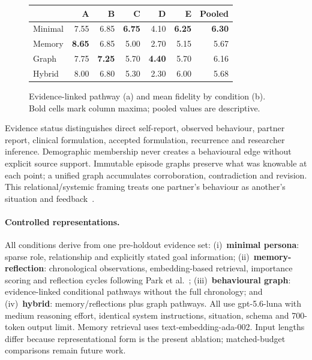 \documentclass{article}
\begin{document}
\begin{figure}[t]
\begin{minipage}[t]{0.50\textwidth}
    \fontsize{7.5}{9}\selectfont
    \begin{tabular}{lrrrrrr}
      \toprule
               & \textbf{A} & \textbf{B} & \textbf{C} & \textbf{D} & \textbf{E} & \textbf{Pooled} \\
      \midrule
      Minimal  & 7.55 & 6.85 & \textbf{6.75} & 4.10 & \textbf{6.25} & \textbf{6.30} \\
      Memory   & \textbf{8.65} & 6.85 & 5.00 & 2.70 & 5.15 & 5.67 \\
      Graph    & 7.75 & \textbf{7.25} & 5.70 & \textbf{4.40} & 5.70 & 6.16 \\
      Hybrid   & 8.00 & 6.80 & 5.30 & 2.30 & 6.00 & 5.68 \\
      \bottomrule
    \end{tabular}
  \end{minipage}
  \caption{Evidence-linked pathway (a) and mean fidelity by condition (b). Bold cells mark
    column maxima; pooled values are descriptive.}
  \label{fig:main}
\end{figure} Evidence status distinguishes direct self-report, observed behaviour, partner report,
clinical formulation, accepted formulation, recurrence and researcher inference. Demographic
membership never creates a behavioural edge without explicit source support. Immutable episode
graphs preserve what was knowable at each point; a unified graph accumulates corroboration,
contradiction and revision. This relational/systemic framing treats one partner's behaviour as
another's situation and feedback~\cite{smith1993appraisal,capozzi2025flowchart}.

\paragraph{Controlled representations.}
All conditions derive from one pre-holdout evidence set: (i)~\textbf{minimal persona}: sparse role,
relationship and explicitly stated goal information; (ii)~\textbf{memory-reflection}: chronological
observations, embedding-based retrieval, importance scoring and reflection cycles following Park
et al.~\cite{park2023generative}; (iii)~\textbf{behavioural graph}: evidence-linked conditional pathways without
the full chronology; and (iv)~\textbf{hybrid}: memory/reflections plus graph pathways. All use
gpt-5.6-luna with medium reasoning effort, identical system instructions, situation, schema and
700-token output limit. Memory retrieval uses text-embedding-ada-002. Input lengths differ
because representational form is the present ablation; matched-budget comparisons remain future
work.
\end{document}
